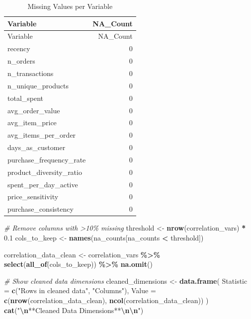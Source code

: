 \documentclass[
]{article}
\newenvironment{Shaded}{\begin{snugshade}}{\end{snugshade}}
\newcommand{\AttributeTok}[1]{\textcolor[rgb]{0.13,0.29,0.53}{#1}}
\newcommand{\CommentTok}[1]{\textcolor[rgb]{0.56,0.35,0.01}{\textit{#1}}}
\newcommand{\FloatTok}[1]{\textcolor[rgb]{0.00,0.00,0.81}{#1}}
\newcommand{\FunctionTok}[1]{\textcolor[rgb]{0.13,0.29,0.53}{\textbf{#1}}}
\newcommand{\NormalTok}[1]{#1}
\newcommand{\OtherTok}[1]{\textcolor[rgb]{0.56,0.35,0.01}{#1}}
\newcommand{\SpecialCharTok}[1]{\textcolor[rgb]{0.81,0.36,0.00}{\textbf{#1}}}
\newcommand{\StringTok}[1]{\textcolor[rgb]{0.31,0.60,0.02}{#1}}
\begin{document}
\begin{longtable}[]{@{}lr@{}}
\caption{Missing Values per Variable}\tabularnewline
\toprule\noalign{}
Variable & NA\_Count \\
\midrule\noalign{}
\endfirsthead
\toprule\noalign{}
Variable & NA\_Count \\
\midrule\noalign{}
\endhead
\bottomrule\noalign{}
\endlastfoot
recency & 0 \\
n\_orders & 0 \\
n\_transactions & 0 \\
n\_unique\_products & 0 \\
total\_spent & 0 \\
avg\_order\_value & 0 \\
avg\_item\_price & 0 \\
avg\_items\_per\_order & 0 \\
days\_as\_customer & 0 \\
purchase\_frequency\_rate & 0 \\
product\_diversity\_ratio & 0 \\
spent\_per\_day\_active & 0 \\
price\_sensitivity & 0 \\
purchase\_consistency & 0 \\
\end{longtable}

\begin{Shaded}
\begin{Highlighting}[]
\CommentTok{\# Remove columns with \textgreater{}10\% missing}
\NormalTok{threshold }\OtherTok{\textless{}{-}} \FunctionTok{nrow}\NormalTok{(correlation\_vars) }\SpecialCharTok{*} \FloatTok{0.1}
\NormalTok{cols\_to\_keep }\OtherTok{\textless{}{-}} \FunctionTok{names}\NormalTok{(na\_counts[na\_counts }\SpecialCharTok{\textless{}}\NormalTok{ threshold])}

\NormalTok{correlation\_data\_clean }\OtherTok{\textless{}{-}}\NormalTok{ correlation\_vars }\SpecialCharTok{\%\textgreater{}\%}
  \FunctionTok{select}\NormalTok{(}\FunctionTok{all\_of}\NormalTok{(cols\_to\_keep)) }\SpecialCharTok{\%\textgreater{}\%}
  \FunctionTok{na.omit}\NormalTok{()}

\CommentTok{\# Show cleaned data dimensions}
\NormalTok{cleaned\_dimensions }\OtherTok{\textless{}{-}} \FunctionTok{data.frame}\NormalTok{(}
  \AttributeTok{Statistic =} \FunctionTok{c}\NormalTok{(}\StringTok{"Rows in cleaned data"}\NormalTok{, }\StringTok{"Columns"}\NormalTok{),}
  \AttributeTok{Value =} \FunctionTok{c}\NormalTok{(}\FunctionTok{nrow}\NormalTok{(correlation\_data\_clean), }\FunctionTok{ncol}\NormalTok{(correlation\_data\_clean))}
\NormalTok{)}
\FunctionTok{cat}\NormalTok{(}\StringTok{"}\SpecialCharTok{\textbackslash{}n}\StringTok{**Cleaned Data Dimensions**}\SpecialCharTok{\textbackslash{}n\textbackslash{}n}\StringTok{"}\NormalTok{)}
\end{Highlighting}
\end{Shaded}
\end{document}
